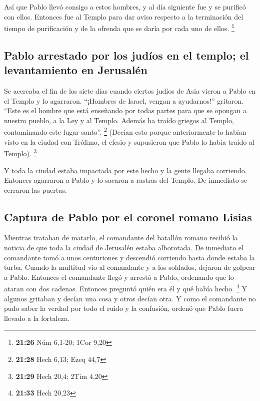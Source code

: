  Así que Pablo llevó consigo a estos hombres, y al día
siguiente fue y se purificó con ellos. Entonces fue al Templo para dar
aviso respecto a la terminación del tiempo de purificación y de la
ofrenda que se daría por cada uno de ellos. \footnote{\textbf{21:26} Núm
  6,1-20; 1Cor 9,20}

\hypertarget{pablo-arrestado-por-los-juduxedos-en-el-templo-el-levantamiento-en-jerusaluxe9n}{%
\subsection{Pablo arrestado por los judíos en el templo; el
levantamiento en
Jerusalén}\label{pablo-arrestado-por-los-juduxedos-en-el-templo-el-levantamiento-en-jerusaluxe9n}}

 Se acercaba el fin de los siete días cuando ciertos
judíos de Asia vieron a Pablo en el Templo y lo agarraron.
 ``¡Hombres de Israel, vengan a ayudarnos!'' gritaron.
``Este es el hombre que está enseñando por todas partes para que se
opongan a nuestro pueblo, a la Ley y al Templo. Además ha traído griegos
al Templo, contaminando este lugar santo''. \footnote{\textbf{21:28}
  Hech 6,13; Ezeq 44,7}  (Decían esto porque
anteriormente lo habían visto en la ciudad con Trófimo, el efesio y
supusieron que Pablo lo había traído al Templo). \footnote{\textbf{21:29}
  Hech 20,4; 2Tim 4,20}

 Y toda la ciudad estaba impactada por este hecho y la
gente llegaba corriendo. Entonces agarraron a Pablo y lo sacaron a
rastras del Templo. De inmediato se cerraron las puertas.

\hypertarget{captura-de-pablo-por-el-coronel-romano-lisias}{%
\subsection{Captura de Pablo por el coronel romano
Lisias}\label{captura-de-pablo-por-el-coronel-romano-lisias}}

 Mientras trataban de matarlo, el comandante del batallón
romano recibió la noticia de que toda la ciudad de Jerusalén estaba
alborotada.  De inmediato el comandante tomó a unos
centuriones y descendió corriendo hasta donde estaba la turba. Cuando la
multitud vio al comandante y a los soldados, dejaron de golpear a Pablo.
 Entonces el comandante llegó y arrestó a Pablo,
ordenando que lo ataran con dos cadenas. Entonces preguntó quién era él
y qué había hecho. \footnote{\textbf{21:33} Hech 20,23} 
Y algunos gritaban y decían una cosa y otros decían otra. Y como el
comandante no pudo saber la verdad por todo el ruido y la confusión,
ordenó que Pablo fuera llevado a la fortaleza.

